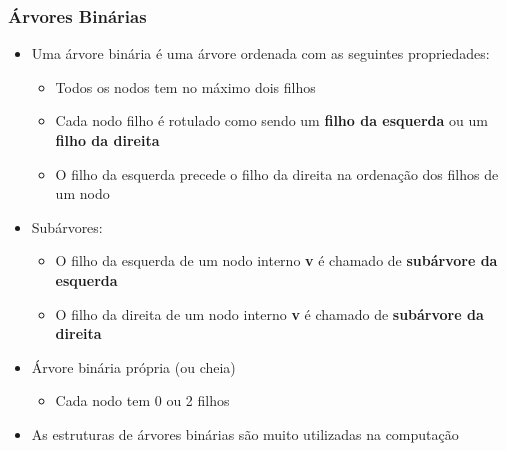 \documentclass[aspectratio=169]{beamer}
\begin{document}
\begin{frame}\frametitle{Árvores Binárias}
\begin{itemize}
	\item Uma árvore binária é uma árvore ordenada com as seguintes propriedades:
	\begin{itemize}
		\item Todos os nodos tem no máximo dois filhos
		\item Cada nodo filho é rotulado como sendo um \textbf{filho da esquerda} ou um \textbf{filho da direita}
		\item O filho da esquerda precede o filho da direita na ordenação dos filhos de um nodo
	\end{itemize}
	\item Subárvores:
	\begin{itemize}
		\item O filho da esquerda de um nodo interno \textbf{v} é chamado de \textbf{subárvore da esquerda}
		\item O filho da direita de um nodo interno \textbf{v} é chamado de \textbf{subárvore da direita}
	\end{itemize}
	\item Árvore binária própria (ou cheia)
	\begin{itemize}
		\item Cada nodo tem 0 ou 2 filhos
	\end{itemize}
	\item As estruturas de árvores binárias são muito utilizadas na computação
\end{itemize}
\end{frame}
\end{document}
